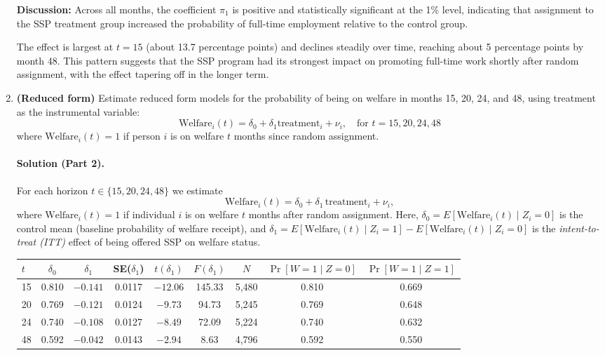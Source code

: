 \documentclass[12pt]{article}
\begin{document}
\begin{enumerate}[label=\arabic*.]
    \textbf{Discussion:}
    Across all months, the coefficient $\pi_1$ is positive and statistically significant at the 1\% level, indicating that assignment to the SSP treatment group increased the probability of full-time employment relative to the control group. 

    The effect is largest at $t=15$ (about 13.7 percentage points) and declines steadily over time, reaching about 5 percentage points by month 48. This pattern suggests that the SSP program had its strongest impact on promoting full-time work shortly after random assignment, with the effect tapering off in the longer term. 


    \item \textbf{(Reduced form)} Estimate reduced form models for the probability of being on welfare in months 15, 20, 24, and 48, using treatment as the instrumental variable:
    \[
    \text{Welfare}_i(t) = \delta_0 + \delta_1 \text{treatment}_i + \nu_i, \quad \text{for } t = 15, 20, 24, 48
    \]
    where $\text{Welfare}_i(t) = 1$ if person $i$ is on welfare $t$ months since random assignment.

    \paragraph{Solution (Part 2).}
    For each horizon \(t\in\{15,20,24,48\}\) we estimate
    \[
    \text{Welfare}_i(t)=\delta_0+\delta_1\,\text{treatment}_i+\nu_i,
    \]
    where \(\text{Welfare}_i(t)=1\) if individual \(i\) is on welfare \(t\) months after random assignment.  
    Here, \(\delta_0=E[\text{Welfare}_i(t)\mid Z_i=0]\) is the control mean (baseline probability of welfare receipt), and \(\delta_1=E[\text{Welfare}_i(t)\mid Z_i=1]-E[\text{Welfare}_i(t)\mid Z_i=0]\) is the \emph{intent-to-treat (ITT)} effect of being offered SSP on welfare status.

    \begin{center}
    \begin{tabular}{@{}lcccccccc@{}}
    \toprule
    $t$ & $\delta_0$ & $\delta_1$ & SE($\delta_1$) & $t(\delta_1)$ & $F(\delta_1)$ & $N$ & $\Pr[W{=}1\mid Z{=}0]$ & $\Pr[W{=}1\mid Z{=}1]$ \\
    \midrule
    15 & 0.810 & $-0.141$ & 0.0117 & $-12.06$ & 145.33 & 5{,}480 & 0.810 & 0.669 \\
    20 & 0.769 & $-0.121$ & 0.0124 & $-9.73$ & 94.73 & 5{,}245 & 0.769 & 0.648 \\
    24 & 0.740 & $-0.108$ & 0.0127 & $-8.49$ & 72.09 & 5{,}224 & 0.740 & 0.632 \\
    48 & 0.592 & $-0.042$ & 0.0143 & $-2.94$ & 8.63 & 4{,}796 & 0.592 & 0.550 \\
    \bottomrule
    \end{tabular}
    \end{center}


\end{enumerate}
\end{document}
